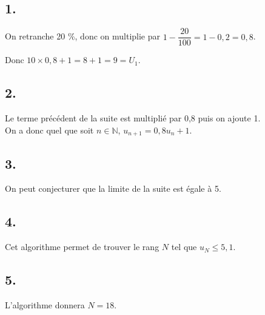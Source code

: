 \subsection*{1.}
	
	On retranche 20 \%, donc on multiplie par \(1 - \dfrac{20}{100} = 1 - 0,2 = 0,8\).
	
	Donc \(10 \times 0,8 + 1 = 8 + 1 = 9 = U_1\).
	
	\subsection*{2.}
	
Le terme précédent de la suite est multiplié par 0,8 puis on ajoute  1.\\
On a donc quel que soit \(n \in \mathbb{N}\), \(u_{n+1} = 0,8 u_n + 1\).
	
	\subsection*{3.}
	
	On peut conjecturer que la limite de la suite est égale à 5.
	
	\subsection*{4.}
	
	Cet algorithme permet de trouver le rang \(N\) tel que \(u_N \leq 5,1\).
	
	\subsection*{5.}
	
	L’algorithme donnera \(N = 18\).

